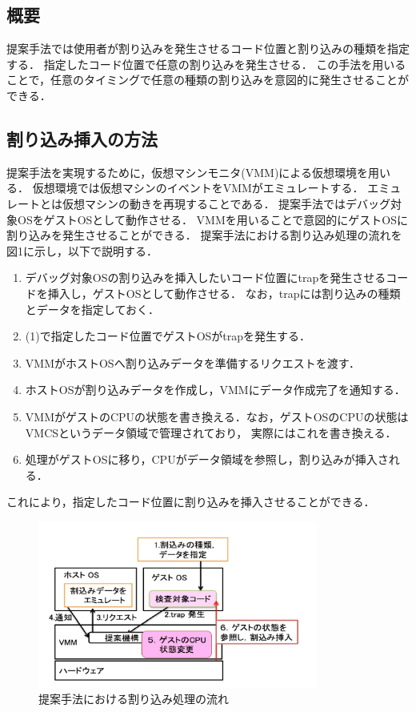 \documentclass[12pt]{jsarticle}
\begin{document}
\subsection{概要}
提案手法では使用者が割り込みを発生させるコード位置と割り込みの種類を指定する．
指定したコード位置で任意の割り込みを発生させる．
この手法を用いることで，任意のタイミングで任意の種類の割り込みを意図的に発生させることができる．
\subsection{割り込み挿入の方法}
提案手法を実現するために，仮想マシンモニタ(VMM)による仮想環境を用いる．
仮想環境では仮想マシンのイベントをVMMがエミュレートする．
エミュレートとは仮想マシンの動きを再現することである．
提案手法ではデバッグ対象OSをゲストOSとして動作させる．
VMMを用いることで意図的にゲストOSに割り込みを発生させることができる．
提案手法における割り込み処理の流れを図1に示し，以下で説明する．
\begin{enumerate}
\item デバッグ対象OSの割り込みを挿入したいコード位置にtrapを発生させるコードを挿入し，ゲストOSとして動作させる．
なお，trapには割り込みの種類とデータを指定しておく．
\item (1)で指定したコード位置でゲストOSがtrapを発生する．
\item VMMがホストOSへ割り込みデータを準備するリクエストを渡す．
\item ホストOSが割り込みデータを作成し，VMMにデータ作成完了を通知する．
\item VMMがゲストのCPUの状態を書き換える．なお，ゲストOSのCPUの状態はVMCSというデータ領域で管理されており，
実際にはこれを書き換える．
\item 処理がゲストOSに移り，CPUがデータ領域を参照し，割り込みが挿入される．
\end{enumerate}
これにより，指定したコード位置に割り込みを挿入させることができる．

\begin{figure}[t]
\begin{center}
\includegraphics[height=5.5cm]{./fig3.jpg}          
\caption{提案手法における割り込み処理の流れ}
\label{fig:up}
\end{center}
\end{figure}
\end{document}
